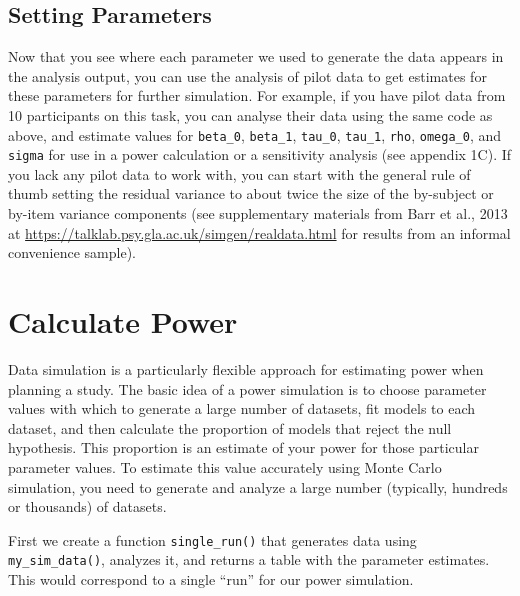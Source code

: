 \documentclass[
  english,
  doc,floatsintext]{apa6}
\begin{document}
\hypertarget{setting-parameters}{%
\subsection{Setting Parameters}\label{setting-parameters}}

Now that you see where each parameter we used to generate the data appears in the analysis output, you can use the analysis of pilot data to get estimates for these parameters for further simulation. For example, if you have pilot data from 10 participants on this task, you can analyse their data using the same code as above, and estimate values for \texttt{beta\_0}, \texttt{beta\_1}, \texttt{tau\_0}, \texttt{tau\_1}, \texttt{rho}, \texttt{omega\_0}, and \texttt{sigma} for use in a power calculation or a sensitivity analysis (see appendix 1C). If you lack any pilot data to work with, you can start with the general rule of thumb setting the residual variance to about twice the size of the by-subject or by-item variance components (see supplementary materials from Barr et al., 2013 at \url{https://talklab.psy.gla.ac.uk/simgen/realdata.html} for results from an informal convenience sample).

\hypertarget{calculate-power}{%
\section{Calculate Power}\label{calculate-power}}

Data simulation is a particularly flexible approach for estimating power when planning a study. The basic idea of a power simulation is to choose parameter values with which to generate a large number of datasets, fit models to each dataset, and then calculate the proportion of models that reject the null hypothesis. This proportion is an estimate of your power for those particular parameter values. To estimate this value accurately using Monte Carlo simulation, you need to generate and analyze a large number (typically, hundreds or thousands) of datasets.

First we create a function \texttt{single\_run()} that generates data using \texttt{my\_sim\_data()}, analyzes it, and returns a table with the parameter estimates. This would correspond to a single \enquote{run} for our power simulation.
\end{document}
